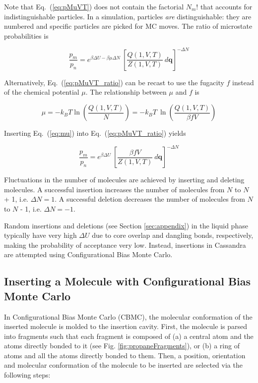 Note that Eq.\ (\ref{eq:pMuVT}) does not contain the factorial $N_m!$ that accounts for indistinguishable particles. In a simulation, particles {\em are} distinguishable: they are numbered and specific particles are picked for MC moves. The ratio of microstate probabilities is

\begin{equation}
\label{eq:pMuVT_ratio}
\frac{p_m}{p_n} = e^{\beta \Delta U - \beta \mu \Delta N}\ \left[\frac{Q(1,V,T)}{Z(1,V,T)}\ d\mathbf{q}\right]^{-\Delta N}
\end{equation}

Alternatively, Eq.\ (\ref{eq:pMuVT_ratio}) can be recast to use the fugacity $f$ instead of the chemical potential $\mu$. The relationship between $\mu$ and $f$ is

\begin{equation}
\label{eq:mu}
\mu = -k_BT \ln\left( \frac{Q(1,V,T)}{N} \right) = -k_BT\ \ln\left( \frac{Q(1,V,T)}{\beta f V} \right)
\end{equation}

Inserting Eq.\ (\ref{eq:mu}) into Eq.\ (\ref{eq:pMuVT_ratio}) yields

\begin{equation}
\label{eq:pfVT_ratio}
\frac{p_m}{p_n} = e^{\beta \Delta U}\ \left[\frac{\beta f V}{Z(1,V,T)}\ d\mathbf{q}\right]^{-\Delta N}
\end{equation}


Fluctuations in the number of molecules are achieved by inserting and deleting molecules. A successful insertion increases the number of molecules from $N$ to $N$ + 1, i.e. $\Delta N = 1$. A successful deletion decreases the number of molecules from $N$ to $N$ - 1, i.e. $\Delta N = -1$. 

Random insertions and deletions (see Section \ref{sec:appendix}) in the liquid phase typically have very high $\Delta U$ due to core overlap and dangling bonds, respectively, making the probability of acceptance very low. Instead, insertions in Cassandra are attempted using Configurational Bias Monte Carlo.

\subsection{Inserting a Molecule with \newline Configurational Bias Monte Carlo}
\label{sec:cbmcInsert}

In Configurational Bias Monte Carlo (CBMC), the molecular conformation of the inserted molecule is molded to the insertion cavity. First, the molecule is parsed into fragments such that each fragment is composed of (a) a central atom and the atoms directly bonded to it (see Fig. \ref{fig:propaneFragments}), or (b) a ring of atoms and all the atoms directly bonded to them. Then, a position, orientation and molecular conformation of the molecule to be inserted are selected via the following steps:

